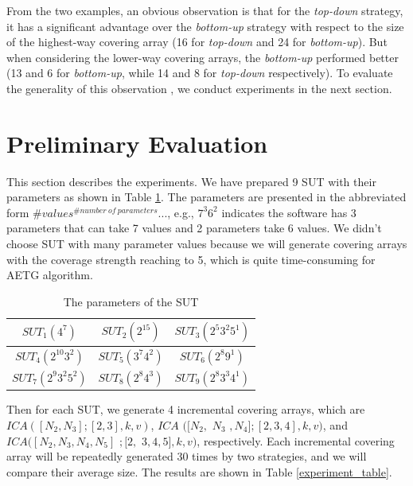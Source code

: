 \documentclass[conference]{IEEEtran}
\theoremstyle{definition}
\begin{document}
From the two examples, an obvious observation is that for the \emph{top-down} strategy, it has a significant advantage over the \emph{bottom-up} strategy with respect to the size of the highest-way covering array (16 for \emph{top-down} and 24 for \emph{bottom-up}). But when  considering the lower-way covering arrays, the \emph{bottom-up} performed better (13 and 6 for \emph{bottom-up}, while 14 and 8 for \emph{top-down} respectively).  To evaluate the generality of this observation , we conduct experiments in the next section.



\section{Preliminary Evaluation}
This section describes the experiments. We have prepared 9 SUT with their parameters as shown in Table \ref{ica_to_constuct}. The parameters are  presented in the abbreviated form $\#values^{\#number\ of\ parameters} ...$, e.g., $7^{3}6^{2}$ indicates the software has 3 parameters that can take 7 values and 2 parameters take 6 values. We didn't choose SUT with many parameter values because we will generate covering arrays with the coverage strength reaching to 5, which is quite time-consuming for AETG algorithm.

\begin{table}
\caption{The parameters of the SUT}
\label{ica_to_constuct}
\center
\begin{tabular}{c | c | c }
\hline  $SUT_{1}(4^{7}) $& $SUT_{2}(2^{15})$ & $SUT_{3}(2^{5}3^{2}5^{1})$ \\
\hline  $SUT_{4}(2^{10}3^{2})$ & $SUT_{5}(3^{7}4^{2})$ & $SUT_{6}(2^{8}9^{1})$ \\
\hline $SUT_{7}(2^{9}3^{2}5^{2})$ & $SUT_{8}(2^{8}4^{3})$ & $SUT_{9}(2^{8}3^{3}4^{1})$ \\
\hline
\end{tabular}
  \end{table}

Then for each SUT, we generate 4 incremental covering arrays, which are $ICA([N_{2},N_{3}]; [2, 3], k ,v)$, $ICA$ $([N_{2},$ $N_{3}$ $,N_{4}];[2, 3,4], k ,v)$, and $ICA([N_{2},N_{3},N_{4},N_{5}]$ $;[2,$ $ 3,4,5], k ,v)$, respectively. Each incremental covering array will be repeatedly generated 30 times by two strategies, and we will compare their average size. The results are shown in Table \ref{experiment_table}.
\end{document}
